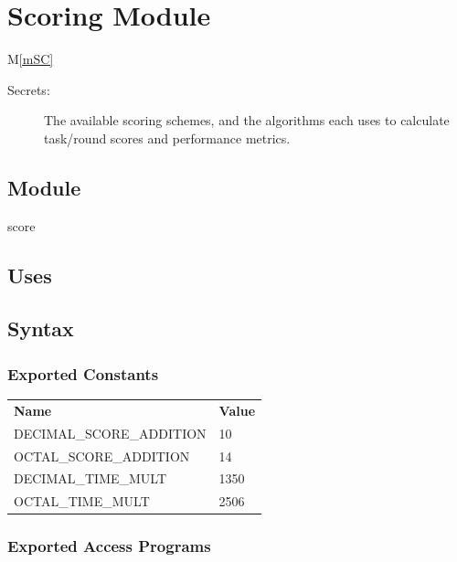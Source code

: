 \documentclass[12pt, titlepage]{article}
\newcommand{\mref}[1]{M\ref{#1}}
\begin{document}
\newpage

\section{Scoring Module} \mref{mSC} 

\begin{description}
\item[Secrets:] The available scoring schemes, and the algorithms each uses to calculate task/round scores and performance metrics.
\end{description}

\subsection{Module}

score

\subsection{Uses}


\subsection{Syntax}

\subsubsection{Exported Constants}

\begin{center}
\begin{tabular}{p{10cm} p{4cm}}
\hline
\textbf{Name} & \textbf{Value}\\
DECIMAL\_SCORE\_ADDITION & 10 \\
OCTAL\_SCORE\_ADDITION & 14 \\
DECIMAL\_TIME\_MULT & 1350 \\
OCTAL\_TIME\_MULT & 2506 \\
\hline


\hline
\end{tabular}
\end{center}

\subsubsection{Exported Access Programs}
\end{document}

